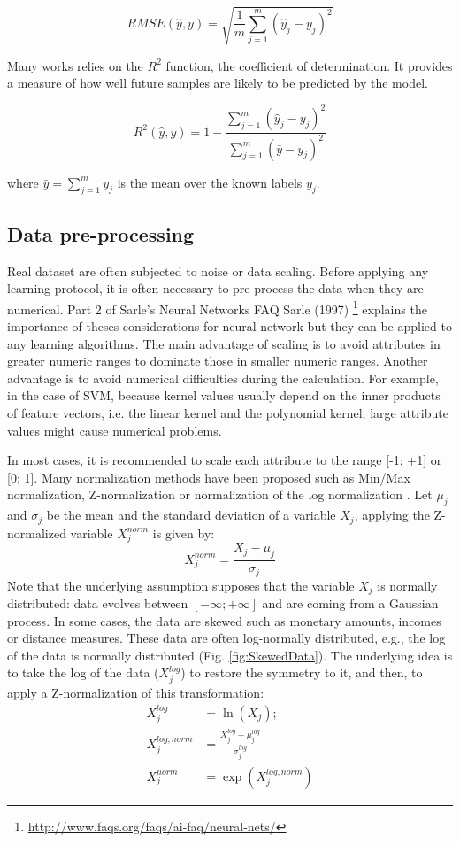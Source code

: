 \begin{equation}
RMSE(\hat{y},y) = \sqrt{\frac{1}{m} \sum_{j=1}^m(\hat{y}_j-y_j)^2}
\end{equation}

Many works relies on the $R^2$ function, the coefficient of determination. It provides a measure of how well future samples are likely to be predicted by the model.

\begin{equation}
R^2(\hat{y},y) = 1- \frac{\sum_{j=1}^m (\hat{y}_j-y_j)^2}{\sum_{j=1}^m (\bar{y}-y_j)^2}
\end{equation}

\noindent where $\bar{y} = \sum_{j=1}^m y_j$ is the mean over the known labels $y_j$.


\subsection{Data pre-processing}
Real dataset are often subjected to noise or data scaling. Before applying any learning protocol, it is often necessary to pre-process the data when they are numerical. Part 2 of Sarle's Neural Networks FAQ Sarle (1997) \footnote{\url{http://www.faqs.org/faqs/ai-faq/neural-nets/}} explains the importance of theses considerations for neural network but they can be applied to any learning algorithms. The main advantage of scaling is to avoid attributes in greater numeric ranges to dominate those in smaller numeric ranges. Another advantage is to avoid numerical difficulties during the calculation. For example, in the case of SVM, because kernel values usually depend on the inner products of feature vectors, i.e. the linear kernel and the polynomial kernel, large attribute values might cause numerical problems. 

In most cases, it is recommended to scale each attribute to the range [-1; +1] or [0; 1]. Many normalization methods have been proposed such as Min/Max normalization, Z-normalization or normalization of the log normalization . Let $\mu_j$ and $\sigma_j$ be the mean and the standard deviation of a variable $X_j$, applying the Z-normalized variable $X^{norm}_j$ is given by:
\begin{equation}
X^{norm}_j = \frac{X_j-\mu_j}{\sigma_j}
\end{equation}
Note that the underlying assumption supposes that the variable $X_j$ is normally distributed: data evolves between $[-\infty;+\infty]$ and are coming from a Gaussian process. In some cases, the data are skewed such as monetary amounts, incomes or distance measures. These data are often log-normally distributed, e.g., the log of the data is normally distributed (Fig. \ref{fig:SkewedData}). The underlying idea is to take the log of the data ($X^{log}_j$) to restore the symmetry to it, and then, to apply a Z-normalization of this transformation:
\begin{align}
X^{log}_j 		& = \ln(X_j); \\
X^{log,norm}_j 	& = \frac{X^{log}_j-\mu^{log}_j}{\sigma^{log}_j} \\
X^{norm}_j 		& = \exp(X^{log,norm}_j)
\end{align}

